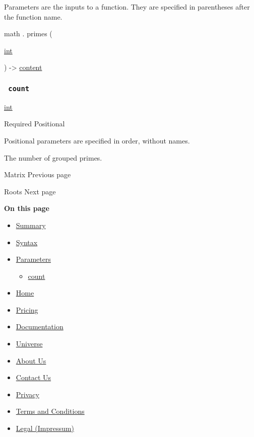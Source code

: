 \label{parameters-tooltip}
Parameters are the inputs to a function. They are specified in
parentheses after the function name.

math { . } { primes } (

{ \href{/docs/reference/foundations/int/}{int} }

) -\textgreater{} \href{/docs/reference/foundations/content/}{content}

\subsubsection{\texorpdfstring{\texttt{\ count\ }}{ count }}\label{parameters-count}

\href{/docs/reference/foundations/int/}{int}

{Required} {{ Positional }}

\label{parameters-count-positional-tooltip}
Positional parameters are specified in order, without names.

The number of grouped primes.

\href{/docs/reference/math/mat/}{\pandocbounded{}}

{ Matrix } { Previous page }

\href{/docs/reference/math/roots/}{\pandocbounded{}}

{ Roots } { Next page }

\textbf{On this page}

\begin{itemize}
\tightlist
\item
  \hyperref[summary]{Summary}
\item
  \hyperref[syntax]{Syntax}
\item
  \hyperref[parameters]{Parameters}

  \begin{itemize}
  \tightlist
  \item
    \hyperref[parameters-count]{count}
  \end{itemize}
\end{itemize}

\begin{itemize}
\tightlist
\item
  \href{/}{Home}
\item
  \href{/pricing/}{Pricing}
\item
  \href{/docs/}{Documentation}
\item
  \href{/universe/}{Universe}
\item
  \href{/about/}{About Us}
\item
  \href{/contact/}{Contact Us}
\item
  \href{/privacy/}{Privacy}
\item
  \href{https://typst.app/terms}{Terms and Conditions}
\item
  \href{/legal/}{Legal (Impressum)}
\end{itemize}

